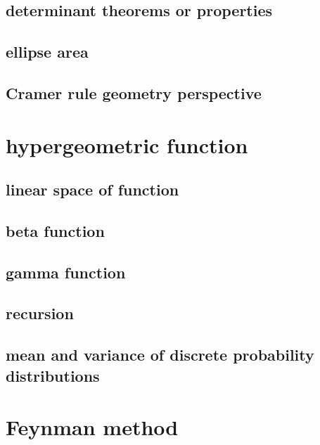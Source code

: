 \documentclass[
]{book}
\theoremstyle{definition}
\theoremstyle{definition}
\theoremstyle{definition}
\theoremstyle{definition}
\theoremstyle{remark}
\begin{document}
\section{determinant theorems or properties}\label{determinant-theorems-or-properties}

\section{ellipse area}\label{ellipse-area}

\section{Cramer rule geometry perspective}\label{cramer-rule-geometry-perspective}

\chapter{hypergeometric function}\label{hypergeometric-function}

\section{linear space of function}\label{linear-space-of-function}

\section{beta function}\label{beta-function}

\section{gamma function}\label{gamma-function}

\section{recursion}\label{recursion}

\section{mean and variance of discrete probability distributions}\label{mean-and-variance-of-discrete-probability-distributions}

\chapter{Feynman method}\label{feynman-method}
\end{document}
